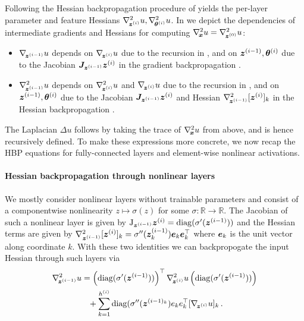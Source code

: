 Following the Hessian backpropagation procedure of  yields the
per-layer parameter and feature Hessians $\nabla_{\!{{\bm{z}}^{(i)}}}^{2}u,
\nabla_{\!{{\bm{\theta}}^{(i)}}}^{2}u$. In  we depict the dependencies of
intermediate gradients and Hessians for computing $\nabla_{\!{{\bm{x}}}}^{2}u = \nabla_{\!{{\bm{z}}^{(0)}}}^{2}u$:
\begin{itemize}
\item $\nabla_{\!{{\bm{z}}^{(i-1)}}}u$ depends on $\nabla_{\!{{\bm{z}}^{(i)}}}u$ due to the recursion in , and on ${\bm{z}}^{(i-1)}, {\bm{\theta}}^{(i)}$ due to the Jacobian ${\bm{J}}_{{\bm{z}}^{(i-1)}}{\bm{z}}^{(i)}$ in the gradient backpropagation .

\item $\nabla_{\!{{\bm{z}}^{(i-1)}}}^{2}u$ depends on $\nabla_{\!{{\bm{z}}^{(i)}}}^{2}u$ and $\nabla_{\!{{\bm{z}}^{(i)}}} u$ due to the recursion in , and on ${\bm{z}}^{(i-1)}, {\bm{\theta}}^{(i)}$ due to the Jacobian ${\bm{J}}_{{\bm{z}}^{(i-1)}}{\bm{z}}^{(i)}$ and Hessian $\nabla_{\!{{\bm{z}}^{(i-1)}}}^{2}[{\bm{z}}^{(i)}]_k$ in the Hessian backpropagation .
\end{itemize}

The Laplacian $\Delta u$ follows by taking the trace of
$\nabla_{\!{{\bm{x}}}}^{2}u$ from above, and is hence recursively defined.
To make these expressions more concrete, we now recap the HBP equations for fully-connected layers and element-wise nonlinear activations.


\paragraph{Hessian backpropagation through nonlinear layers}
We mostly consider nonlinear layers without trainable parameters and consist of a componentwise nonlinearity $z\mapsto \sigma(z)$ for some $\sigma\colon\mathbb R\to\mathbb R$.
The Jacobian of such a nonlinear layer is given by $\mathrm{J}_{{\bm{z}}^{(i-1)}}{\bm{z}}^{(i)} = \operatorname{diag}(\sigma'({\bm{z}}^{(i-1)}))$ and the Hessian terms are given by $\nabla^2_{{\bm{z}}^{(i-1)}}[{\bm{z}}^{(i)}]_k = \sigma''({\bm{z}}^{(i-1)}_k) {\bm{e}}_k {\bm{e}}_k^\top$ where ${\bm{e}}_k$ is the unit vector along coordinate $k$.
With these two identities we can backpropogate the input Hessian through such layers via
\begin{align}
  \begin{split}
    \nabla_{\!{{\bm{z}}^{(i-1)}}}^{2}u
    &=
      \left( \operatorname{diag}(\sigma'({\bm{z}}^{(i-1)})) \right)^{\top}
      \nabla_{\!{{\bm{z}}^{(i)}}}^{2}u
      \left( \operatorname{diag}(\sigma'({\bm{z}}^{(i-1)})) \right)
    \\
    &\phantom{=}+
      \sum_{k=1}^{h^{(i)}}
      \operatorname{diag}(\sigma''({\bm{z}}^{(i-1)_k})
      e_k e_k^\top
      [\nabla_{\!{{\bm{z}}^{(i)}}} u]_k\,.
  \end{split}
\end{align}

